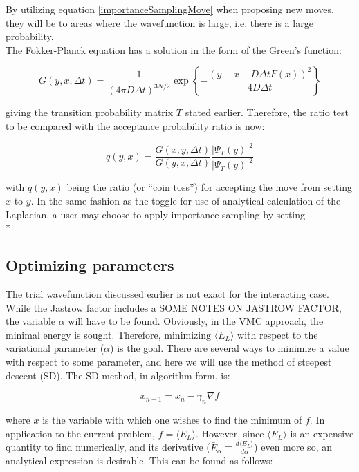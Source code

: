 \documentclass[english, a4paper]{article}
\begin{document}
By utilizing equation \eqref{importanceSamplingMove} when proposing new moves, they will be to areas where the wavefunction is large, i.e. there is a large probability.\\
The Fokker-Planck equation has a solution in the form of the Green's function:

\begin{equation}
 G(y,x,\Delta t) = \frac{1}{(4\pi D\Delta t)^{3N/2}}\exp\left\{-\frac{(y-x-D\Delta tF(x))^2}{4D\Delta t}\right\}
\end{equation}

giving the transition probability matrix $T$ stated earlier. Therefore, the ratio test to be compared with the acceptance probability ratio is now:

\begin{equation}
 q(y,x) = \frac{G(x,y,\Delta t)}{G(y,x,\Delta t)}\frac{|\Psi_T(y)|^2}{|\Psi_T(y)|^2}
\end{equation}

with $q(y,x)$ being the ratio (or ``coin toss'') for accepting the move from setting $x$ to $y$.
In the same fashion as the toggle for use of analytical calculation of the Laplacian, a user may choose to apply importance sampling by setting 
\\*



\subsection{Optimizing parameters}
The trial wavefunction discussed earlier is not exact for the interacting case. While the Jastrow factor includes a SOME NOTES ON JASTROW FACTOR, the variable $\alpha$ will have to be found.
Obviously, in the VMC approach, the minimal energy is sought. Therefore, minimizing $\langle E_L\rangle$ with respect to the variational parameter ($\alpha$) is the goal.
There are several ways to minimize a value with respect to some parameter, and here we will use the method of steepest descent (SD). The SD method, in algorithm form, is:

\begin{equation}
x_{n+1} = x_n - \gamma_n\nabla f
\end{equation}

where $x$ is the variable with which one wishes to find the minimum of $f$. In application to the current problem, $f = \langle E_L\rangle$. However, since $\langle E_L\rangle$ is an expensive quantity to find numerically, and its derivative ($\bar{E}_\alpha \equiv \frac{d\langle E_L\rangle}{d\alpha}$) even more so, an analytical expression is desirable. This can be found as follows:
\end{document}
